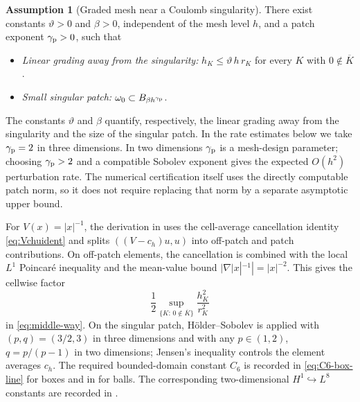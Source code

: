 \documentclass[11pt]{article}
\theoremstyle{plain}
\theoremstyle{definition}
\newtheorem{assumption}{Assumption}
\theoremstyle{remark}
\begin{document}
\begin{assumption}[Graded mesh near a Coulomb singularity]
\label{ass:graded-mesh}
There exist constants $\vartheta>0$ and $\beta>0$, independent of the
mesh level $h$, and a patch exponent $\gamma_{\rm p}>0$,
such that
\begin{itemize}
  \item[(G1)] \emph{Linear grading away from the singularity:}
    $h_K\le\vartheta\,h\,r_K$ for every $K$ with $0\notin\overline K$.
  \item[(G2)] \emph{Small singular patch:}
    $\omega_0\subset B_{\beta h^{\gamma_{\rm p}}}$.
\end{itemize}
\end{assumption}

The constants $\vartheta$ and $\beta$ quantify, respectively, the
linear grading away from the singularity and the size of the singular
patch.  In the rate estimates below we take
$\gamma_{\rm p}=2$ in three dimensions.  In two dimensions
$\gamma_{\rm p}$ is a mesh-design parameter; choosing
$\gamma_{\rm p}>2$ and a compatible Sobolev exponent gives the expected
$O(h^2)$ perturbation rate.  The numerical certification itself uses
the directly computable patch norm, so it does not require replacing
that norm by a separate asymptotic upper bound.

For $V(x)=|x|^{-1}$, the derivation in  uses the
cell-average cancellation identity \eqref{eq:Vchuident} and splits
$((V-c_h)u,u)$ into off-patch and patch contributions.  On off-patch
elements, the cancellation is combined with the local $L^1$ Poincar\'e
inequality and the mean-value bound $|\nabla |x|^{-1}|=|x|^{-2}$.
This gives the cellwise factor
\[
  \frac12\sup_{\{K:\,0\notin\overline K\}}\frac{h_K^2}{r_K^2}
\]
in \eqref{eq:middle-way}.  On the singular patch, H\"older--Sobolev is
applied with $(p,q)=(3/2,3)$ in three dimensions and with any
$p\in(1,2)$, $q=p/(p-1)$ in two dimensions; Jensen's inequality
controls the element averages $c_h$.  The required bounded-domain
constant $C_6$ is recorded in \eqref{eq:C6-box-line} for boxes and in
 for balls.  The corresponding two-dimensional
$H^1\hookrightarrow L^8$ constants are recorded in
.
\end{document}
